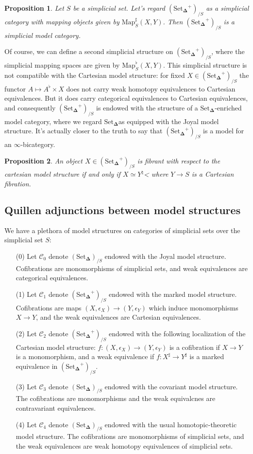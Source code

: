 \documentclass[12pt]{amsart}
\newcommand{\8}{\ensuremath{\infty}}
\newcommand{\C}{\ensuremath{\mathscr{C}}}
\newcommand{\SSet}{\ensuremath{\text{Set}_{\boldsymbol{\Delta}}}}
\newcommand{\Map}{\ensuremath{\text{Map}}}
\newtheorem{proposition}{Proposition}
\begin{document}
\begin{proposition}
  Let $S$ be a simplicial set. Let's regard $(\SSet^+)_{/S}$ as a simplicial category with mapping objects given by $\Map^\sharp_S(X, Y)$. Then $(\SSet^+)_{/S}$ is a simplicial model category.
\end{proposition}

Of course, we can define a second simplicial structure on $(\SSet^+)_{/S}$, where the simplicial mapping spaces are given by $\Map^\flat_S(X, Y)$. This simplicial structure is not compatible with the Cartesian model structure: for fixed $X \in (\SSet^+)_{/S}$ the functor $A\mapsto A^\flat\times X$ does not carry weak homotopy equivalences to Cartesian equivalences. But it does carry categorical equivalences to Cartesian equivalences, and consequently $(\SSet^+)_{/S}$ is endowed with the structure of a \SSet-enriched model category, where we regard \SSet as equipped with the Joyal model structure. It's actually closer to the truth to say that $(\SSet^+)_{/S}$ is a model for an \8-bicategory.


\begin{proposition}
  An object $X \in (\SSet^+)_{/S}$ is fibrant with respect to the cartesian model structure if and only if $X\simeq Y^\natural$< where $Y \rightarrow S$ is a Cartesian fibration.
\end{proposition}

\subsection{Quillen adjunctions between model structures}

We have a plethora of model structures on categories of simplicial sets over the simplicial set $S$:

\begin{itemize}
  \item[(0)] Let $\C_0$ denote $(\SSet)_{/S}$ endowed with the Joyal model structure. Cofibrations are monomorphisms of simplicial sets, and weak equivalences are categorical equivalences.
  \item[(1)]  Let $\C_1$ denote $(\SSet^+)_{/S}$ endowed with the marked model structure. Cofibrations are maps $(X, \epsilon_X) \rightarrow (Y, \epsilon_Y)$ which induce monomorphisms $X \rightarrow Y$, and the weak equivalences are Cartesian equivalences.
  \item[(2)]  Let $\C_2$ denote $(\SSet^+)_{/S}$ endowed with the following localization of the Cartesian model structure: $f : (X, \epsilon_X) \rightarrow (Y, \epsilon_Y)$ is a cofibration if $X \rightarrow Y$ is a monomorphism, and a weak equivalence if $f : X^\sharp \rightarrow Y^\sharp$ is a marked equivalence in $(\SSet^+)_{/S}$.
  \item[(3)]  Let $\C_3$ denote $(\SSet)_{/S}$ endowed with the covariant model structure. The cofibrations are monomorphisms and the weak equivalcnes are contravariant equivalences.
  \item[(4)] Let $\C_4$ denote $(\SSet)_{/S}$ endowed with the usual homotopic-theoretic model structure. The cofibrations are monomorphisms of simplicial sets, and the weak equivalences are weak homotopy equivalences of simplicial sets.
\end{itemize}
\end{document}
